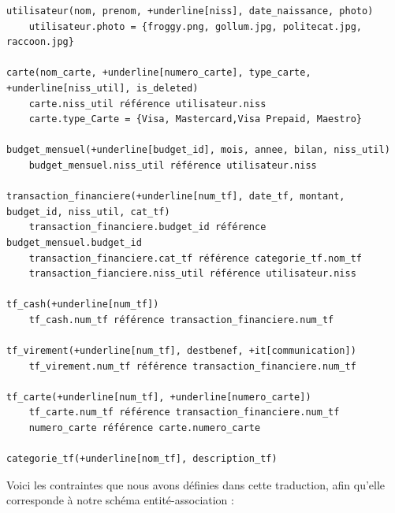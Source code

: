 \documentclass[a4paper,12pt]{article}
\begin{document}
\begin{Verbatim}[commandchars=+\[\]]
utilisateur(nom, prenom, +underline[niss], date_naissance, photo)
	utilisateur.photo = {froggy.png, gollum.jpg, politecat.jpg, raccoon.jpg}

carte(nom_carte, +underline[numero_carte], type_carte, +underline[niss_util], is_deleted)
	carte.niss_util référence utilisateur.niss
	carte.type_Carte = {Visa, Mastercard,Visa Prepaid, Maestro}

budget_mensuel(+underline[budget_id], mois, annee, bilan, niss_util) 
	budget_mensuel.niss_util référence utilisateur.niss

transaction_financiere(+underline[num_tf], date_tf, montant, budget_id, niss_util, cat_tf)
	transaction_financiere.budget_id référence budget_mensuel.budget_id
	transaction_financiere.cat_tf référence categorie_tf.nom_tf
	transaction_fianciere.niss_util référence utilisateur.niss

tf_cash(+underline[num_tf])
	tf_cash.num_tf référence transaction_financiere.num_tf

tf_virement(+underline[num_tf], destbenef, +it[communication])
	tf_virement.num_tf référence transaction_financiere.num_tf

tf_carte(+underline[num_tf], +underline[numero_carte])
	tf_carte.num_tf référence transaction_financiere.num_tf	
	numero_carte référence carte.numero_carte

categorie_tf(+underline[nom_tf], description_tf)
\end{Verbatim}

Voici les contraintes que nous avons définies dans cette traduction, afin qu'elle corresponde à notre schéma entité-association :
\end{document}
